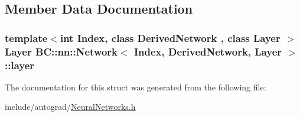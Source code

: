 \subsection{Member Data Documentation}
\subsubsection[{\texorpdfstring{layer}{layer}}]{\setlength{\rightskip}{0pt plus 5cm}template$<$int Index, class Derived\+Network , class Layer $>$ Layer {\bf B\+C\+::nn\+::\+Network}$<$ Index, Derived\+Network, Layer $>$\+::layer}\hypertarget{structBC_1_1nn_1_1Network_3_01Index_00_01DerivedNetwork_00_01Layer_01_4_a9b9c56012926ab07e1dbac3f92af7b61}{}\label{structBC_1_1nn_1_1Network_3_01Index_00_01DerivedNetwork_00_01Layer_01_4_a9b9c56012926ab07e1dbac3f92af7b61}


The documentation for this struct was generated from the following file\+:\begin{DoxyCompactItemize}
\item 
include/autograd/\hyperlink{autograd_2NeuralNetworks_8h}{Neural\+Networks.\+h}\end{DoxyCompactItemize}
